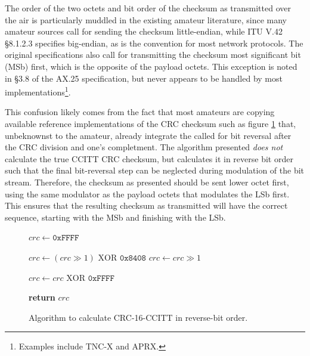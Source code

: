 \documentclass[12pt,letterpaper]{article}
\begin{document}
The order of the two octets and bit order of the checksum 
as transmitted over the air 
is particularly muddled in the existing amateur literature, 
since many amateur sources call for sending the
checksum little-endian, while ITU V.42 \S8.1.2.3 specifies big-endian,
as is the convention for most network protocols.
The original specifications also call for transmitting the checksum most
significant bit (MSb) first, which is the opposite of the payload octets.
This exception is noted in \S3.8 of the AX.25 specification, 
but never appears to be handled by most implementations\footnote{Examples
include TNC-X and APRX.}.

This confusion likely comes from the fact that most amateurs are copying
available reference implementations of the CRC checksum such as
figure \ref{fig:crcccittcode} that,
unbeknownst to the amateur, already integrate the called for bit reversal 
after the CRC division and one's completment.
The algorithm presented \emph{does not} calculate the true CCITT CRC checksum, but
calculates it in reverse bit order such that the final bit-reversal step 
can be neglected during modulation of the bit stream.
Therefore, the checksum as presented should be sent lower octet first, 
using the same modulator as the payload octets that modulates the LSb first.
This ensures that the resulting checksum as transmitted will have the 
correct sequence, starting with the MSb and finishing with the LSb.


\begin{figure}
	\begin{algorithmic}[1]
		\State $crc \gets \texttt{0xFFFF}$

			\State $crc \gets (crc \gg 1) \textrm{ XOR } \texttt{0x8408}$
		\Else
			\State $crc \gets crc \gg 1$
		\EndIf
		\EndFor
		\EndFor

		\State $crc \gets crc \textrm{ XOR } \texttt{0xFFFF}$

		\State \textbf{return} $crc$
		\EndFunction
	\end{algorithmic}

	\caption{Algorithm to calculate CRC-16-CCITT in reverse-bit order.}
	\label{fig:crcccittcode}
\end{figure}
\end{document}

